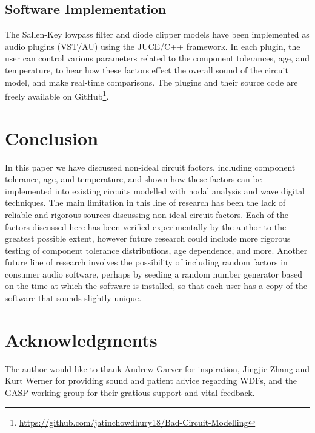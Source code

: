 \documentclass[twoside,a4paper]{article}
\begin{document}
\subsection{Software Implementation} \label{sec:soft-impl}
%
The Sallen-Key lowpass filter and diode clipper models have been implemented
as audio plugins (VST/AU) using the JUCE/C++ framework. In each plugin,
the user can control various parameters related to the component
tolerances, age, and temperature, to hear how these factors effect the
overall sound of the circuit model, and make real-time comparisons. The
plugins and their source code are freely available on
GitHub\footnote{\url{https://github.com/jatinchowdhury18/Bad-Circuit-Modelling}}.

\section{Conclusion} \label{sec:conclusion}
%
In this paper we have discussed non-ideal circuit factors, including
component tolerance, age, and temperature, and shown how these factors
can be implemented into existing circuits modelled with nodal analysis
and wave digital techniques.
\newline\newline
The main limitation in this line of research has been the lack of
reliable and rigorous sources discussing non-ideal circuit factors.
Each of the factors discussed here has been verified experimentally
by the author to the greatest possible extent, however future research
could include more rigorous testing of component tolerance distributions,
age dependence, and more. Another future line of research involves the
possibility of including random factors in consumer audio software, perhaps
by seeding a random number generator based on the time at which the
software is installed, so that each user has a copy of the software that
sounds slightly unique.

\section{Acknowledgments}
%
The author would like to thank Andrew Garver for inspiration, Jingjie Zhang
and Kurt Werner for providing sound and patient advice regarding WDFs, and the
GASP working group for their gratious support and vital feedback.

\nocite{*}


\end{document}
